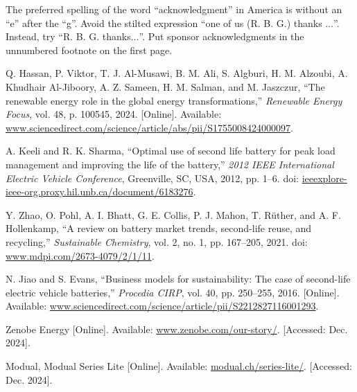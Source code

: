 \documentclass[conference]{IEEEtran}
\begin{document}

The preferred spelling of the word ``acknowledgment'' in America is without 
an ``e'' after the ``g''. Avoid the stilted expression ``one of us (R. B. 
G.) thanks $\ldots$''. Instead, try ``R. B. G. thanks$\ldots$''. Put sponsor 
acknowledgments in the unnumbered footnote on the first page.

\begin{thebibliography}{00}
 Q. Hassan, P. Viktor, T. J. Al-Musawi, B. M. Ali, S. Algburi, H. M. Alzoubi, A. Khudhair Al-Jiboory, A. Z. Sameen, H. M. Salman, and M. Jaszczur, ``The renewable energy role in the global energy transformations,'' \textit{Renewable Energy Focus}, vol. 48, p. 100545, 2024. [Online]. Available: \href{https://www.sciencedirect.com/science/article/abs/pii/S1755008424000097?casa_token=bUNZr0M6nogAAAAA:BW6rOq1yhF3iUOtobThX-tDWVjZDpJL9Hzmk0HS78usaDj24Zq_MftqZLBkgYpIrtdgdilaX}{www.sciencedirect.com/science/article/abs/pii/S1755008424000097}.

 A. Keeli and R. K. Sharma, ``Optimal use of second life battery for peak load management and improving the life of the battery,''  \textit{2012 IEEE International Electric Vehicle Conference}, Greenville, SC, USA, 2012, pp. 1--6. doi: \href{https://ieeexplore-ieee-org.proxy.hil.unb.ca/document/6183276}{ieeexplore-ieee-org.proxy.hil.unb.ca/document/6183276}.


 Y. Zhao, O. Pohl, A. I. Bhatt, G. E. Collis, P. J. Mahon, T. Rüther, and A. F. Hollenkamp, ``A review on battery market trends, second-life reuse, and recycling,'' \textit{Sustainable Chemistry}, vol. 2, no. 1, pp. 167--205, 2021. doi: \href{https://www.mdpi.com/2673-4079/2/1/11}{www.mdpi.com/2673-4079/2/1/11}.

 N. Jiao and S. Evans, ``Business models for sustainability: The case of second-life electric vehicle batteries,'' \textit{Procedia CIRP}, vol. 40, pp. 250--255, 2016. [Online]. Available: \href{https://www.sciencedirect.com/science/article/pii/S2212827116001293}{www.sciencedirect.com/science/article/pii/S2212827116001293}.

 Zenobe Energy [Online]. Available: \href{https://www.zenobe.com/our-story/}{www.zenobe.com/our-story/}. [Accessed: Dec. 2024].

 Modual, Modual Series Lite [Online]. Available: \href{https://modual.ch/series-lite/}{modual.ch/series-lite/}. [Accessed: Dec. 2024].


\end{thebibliography}
\end{document}
